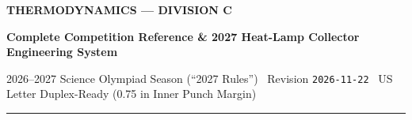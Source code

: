 \thispagestyle{plain}
\label{sec:front}
\begin{center}
  {\sffamily\bfseries\fontsize{22}{25}\selectfont\color{navy} THERMODYNAMICS --- DIVISION C}\par\vspace{3pt}
  {\sffamily\bfseries\large Complete Competition Reference \& 2027 Heat-Lamp Collector Engineering System}\par\vspace{2pt}
  {\sffamily\footnotesize 2026--2027 Science Olympiad Season (``2027 Rules'') \textperiodcentered\ Revision \texttt{2026-11-22} \textperiodcentered\ US Letter Duplex-Ready (0.75 in Inner Punch Margin)}\par
  \vspace{3pt}\textcolor{navy}{\rule{\linewidth}{1.4pt}}
\end{center}
\vspace{-4pt}

